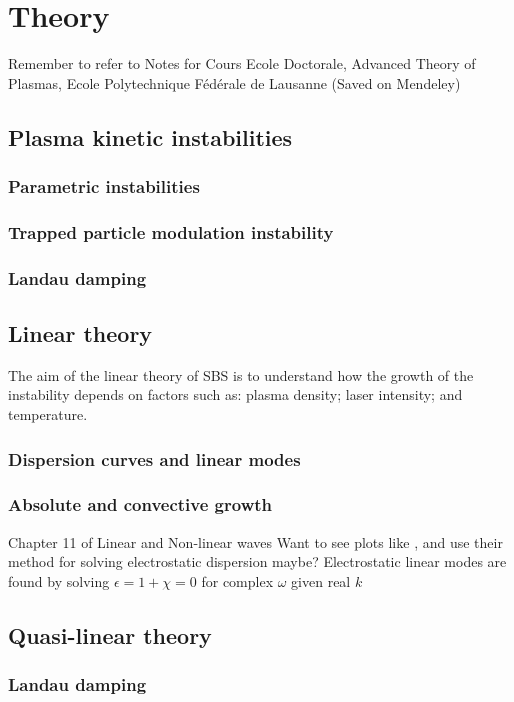 \chapter{Theory}
\label{chp:theory}

Remember to refer to Notes for Cours Ecole Doctorale, Advanced Theory of Plasmas, Ecole Polytechnique Fédérale de Lausanne (Saved on Mendeley)

\section{Plasma kinetic instabilities}
\subsection{Parametric instabilities}
\subsection{Trapped particle modulation instability}
\subsection{Landau damping}

\section{Linear theory}
The aim of the linear theory of \acrshort{SBS} is to understand how the growth of the instability depends on factors such as: plasma density; laser intensity; and temperature.
\subsection{Dispersion curves and linear modes}
\subsection{Absolute and convective growth}
Chapter 11 of Linear and Non-linear waves
Want to see plots like \cite{Strozzi2007}, and use their method for solving electrostatic dispersion maybe?
Electrostatic linear modes are found by solving $\epsilon = 1 + \chi = 0$ for complex $\omega$ given real $k$

\section{Quasi-linear theory}
\subsection{Landau damping}


